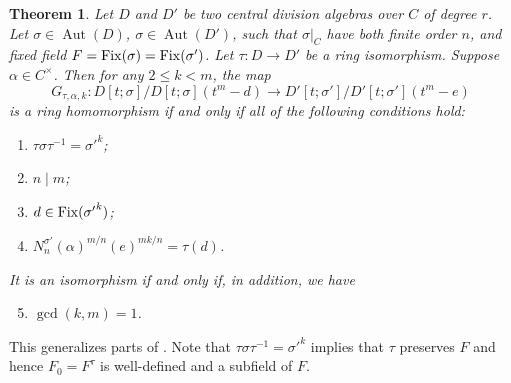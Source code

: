 \documentclass{amsart}
\theoremstyle{plain}
\newtheorem{theorem}{Theorem}[section]
\theoremstyle{definition}
\numberwithin{equation}{section}
\numberwithin{figure}{section}
\DeclareMathOperator{\Aut}{Aut}
\begin{document}
\begin{theorem}\label{thm:G}
Let $D$ and $D'$ be two central division algebras over $C$ of degree $r$. Let $\sigma\in \Aut (D)$, $\sigma\in \Aut (D')$,
such that $\sigma|_{C}$ have both finite order $n$,  and fixed field $F={\rm Fix}(\sigma)={\rm Fix}(\sigma')$.
 Let $\tau:D\to D'$ be a ring isomorphism. 
Suppose  $\alpha \in C^\times$.
Then for any $2\leq k < m$, the map
$$
 G_{\tau,\alpha,k}:D[t;\sigma]/D[t;\sigma](t^m-d)\to D'[t;\sigma']/D'[t;\sigma'](t^m-e)
 $$
 is a ring homomorphism  if and only if all of the following conditions hold:
 \begin{enumerate} \setlength{\itemsep}{0pt}
        \item \label{C:k=1} $ \tau\sigma \tau^{-1}={\sigma'}^k$;
        \item \label{C:n|m} $n\mid m$; 
        \item \label{C:inF} $d\in {\rm Fix}({\sigma'}^k)$;
        \item \label{C:norm} $N_{n}^{{\sigma'}}(\alpha)^{m/n}(e)^{mk/n}=\tau(d)$. 
    \end{enumerate}
 It is an isomorphism if and only if, in addition, we have
    \begin{enumerate} \setcounter{enumi}{4}
        \item \label{C:relprime} $\gcd(k,m)=1$.
  \end{enumerate}
\end{theorem}

 This generalizes parts of \cite[Theorem 4.4]{NevPum2025}. Note that $ \tau\sigma \tau^{-1}={\sigma'}^k$ implies that $\tau$ preserves $F$ and hence $F_0=F^\tau$ is well-defined and  a subfield of $F$.
\end{document}
